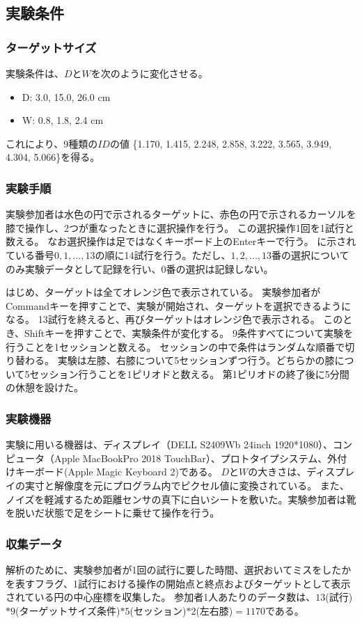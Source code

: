 \documentclass[submit, techrep]{ipsj}
\begin{document}
\subsection{実験条件}
\subsubsection{ターゲットサイズ}
実験条件は、$D$と$W$を次のように変化させる。
\begin{itemize}
	\item {D: } 3.0, 15.0, 26.0 \si{cm}
	\item {W: } 0.8, 1.8, 2.4 \si{cm}
\end{itemize}
これにより、9種類の$ID$の値 \{1.170, 1.415, 2.248, 2.858, 3.222, 3.565, 3.949, 4.304, 5.066\}を得る。

\subsubsection{実験手順}
実験参加者は水色の円で示されるターゲットに、赤色の円で示されるカーソルを膝で操作し、2つが重なったときに選択操作を行う。
この選択操作1回を1試行と数える。
なお選択操作は足ではなくキーボード上のEnterキーで行う。
に示されている番号$0,1,...,13$の順に14試行を行う。ただし、$1,2,...,13$番の選択についてのみ実験データとして記録を行い、$0$番の選択は記録しない。\par
はじめ、ターゲットは全てオレンジ色で表示されている。
実験参加者がCommandキーを押すことで、実験が開始され、ターゲットを選択できるようになる。
13試行を終えると、再びターゲットはオレンジ色で表示される。
このとき、Shiftキーを押すことで、実験条件が変化する。
9条件すべてについて実験を行うことを1セッションと数える。
セッションの中で条件はランダムな順番で切り替わる。
実験は左膝、右膝について5セッションずつ行う。どちらかの膝について5セッション行うことを1ピリオドと数える。
第1ピリオドの終了後に5分間の休憩を設けた。
\subsubsection{実験機器}
実験に用いる機器は、ディスプレイ（DELL S2409Wb 24inch 1920*1080）、コンピュータ（Apple MacBookPro 2018 TouchBar）、プロトタイプシステム、外付けキーボード(Apple Magic Keyboard 2)である。
$D$と$W$の大きさは、ディスプレイの実寸と解像度を元にプログラム内でピクセル値に変換されている。
また、ノイズを軽減するため距離センサの真下に白いシートを敷いた。実験参加者は靴を脱いだ状態で足をシートに乗せて操作を行う。
\subsubsection{収集データ}
解析のために、実験参加者が1回の試行に要した時間、選択おいてミスをしたかを表すフラグ、1試行における操作の開始点と終点およびターゲットとして表示されている円の中心座標を収集した。
参加者1人あたりのデータ数は、$13$(試行)$*9$(ターゲットサイズ条件)$*5$(セッション)$*2$(左右膝)$ = 1170$である。
\end{document}
